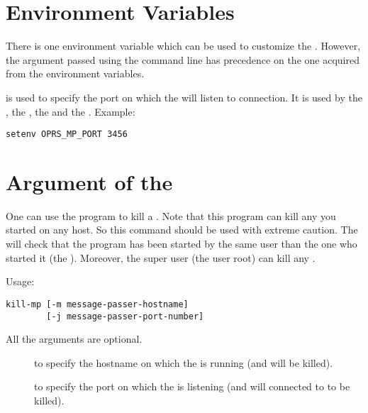 \section{\MP{} Environment Variables}

There is one environment variable which can be used to customize the \MP{}.
However, the argument passed using the command line has precedence on the one
acquired from the environment variables.

\begin{description}

\item[\code{OPRS\_MP\_PORT}] is used  to specify the port on which the \MP{} will
listen to connection. It is used by the \CPK{}, the \XPK{}, the \OPRSS{}
and the \MP{}.\*
Example:
\begin{verbatim}
setenv OPRS_MP_PORT 3456
\end{verbatim}

\end{description}

\section{Argument of the \MPK{}}

One can use the  program to kill a \MP{}. Note that this program
can kill any \MP{} you started on any host. So this command should be used with
extreme caution. The \MP{} will check that the \MPK{} program has been started
by the same user than the one who started it (the \MP{}). Moreover, the super
user (the user root) can kill any \MP{}.  

Usage: \begin{verbatim}
kill-mp [-m message-passer-hostname]
        [-j message-passer-port-number]       

\end{verbatim}

All the arguments are optional.

\begin{description}

\item[] to specify the hostname on which the \MP{} is running (and will
be killed).

\item[] to specify the port on which the \MP{} is listening (and will
connected to to be killed).

\end{description}

